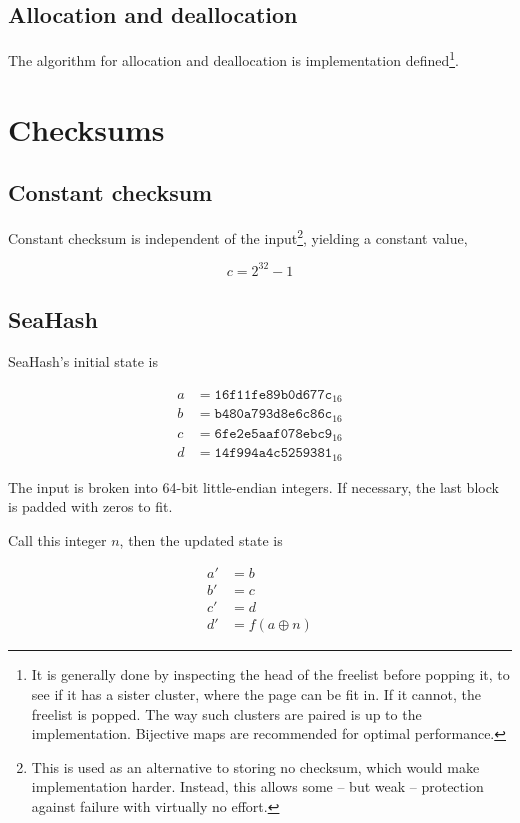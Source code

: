 \documentclass[11pt,a4paper]{report}
\begin{document}
        \subsection{Allocation and deallocation}
        The algorithm for allocation and deallocation is implementation
        defined\footnote{It is generally done by inspecting the head of the
            freelist before popping it, to see if it has a sister cluster,
            where the page can be fit in. If it cannot, the freelist is popped.
            The way such clusters are paired is up to the implementation.
            Bijective maps are recommended for optimal performance.}.

    \section{Checksums}
        \subsection{Constant checksum}
        \label{checksum:seahash}
        Constant checksum is independent of the input\footnote{This is used as
        an alternative to storing no checksum, which would make implementation
        harder. Instead, this allows some -- but weak -- protection against failure
        with virtually no effort.}, yielding a constant value,

        $$c = 2^{32} - 1$$

        \subsection{SeaHash}
        \label{checksum:seahash}
        SeaHash's initial state is

        \begin{align*}
            a &= \texttt{16f11fe89b0d677c}_{16} \\
            b &= \texttt{b480a793d8e6c86c}_{16} \\
            c &= \texttt{6fe2e5aaf078ebc9}_{16} \\
            d &= \texttt{14f994a4c5259381}_{16}
        \end{align*}

        The input is broken into 64-bit little-endian integers. If necessary,
        the last block is padded with zeros to fit.

        Call this integer $n$, then the updated state is

        \begin{align*}
            a' &= b \\
            b' &= c \\
            c' &= d \\
            d' &= f(a \oplus n)
        \end{align*}
\end{document}
